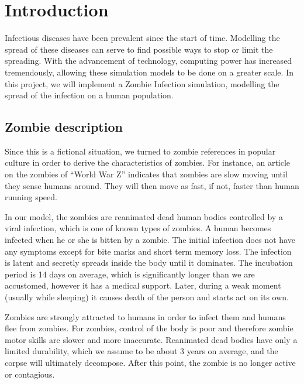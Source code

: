 \documentclass[a4paper]{article}
\title{\mytitle}
\author{Adam Juraszek \and Ryan Leong Wei Shiong \and Matthew Signorini \and Ziying Yang}
\begin{document}
\maketitle
\tableofcontents
\newpage

\section{Introduction}

Infectious diseases have been prevalent since the start of time.
Modelling the spread of these diseases can serve to find possible ways to stop or limit the spreading.
With the advancement of technology, computing power has increased tremendously, allowing these simulation models to be done on a greater scale.
In this project, we will implement a Zombie Infection simulation, modelling the spread of the infection on a human population.

\subsection{Zombie description}

Since this is a fictional situation, we turned to zombie references in popular culture in order to derive the characteristics of zombies.
For instance, an article on the zombies of ``World War Z'' indicates that zombies are slow moving until they sense humans around.
They will then move as fast, if not, faster than human running speed. \cite{guidetozombies}

In our model, the zombies are reanimated dead human bodies controlled by a viral infection, which is one of known types of zombies. \cite{survivingthedead}
A human becomes infected when he or she is bitten by a zombie.
The initial infection does not have any symptoms except for bite marks and short term memory loss.
The infection is latent and secretly spreads inside the body until it dominates.
The incubation period is 14 days on average, which is significantly longer than we are accustomed, however it has a medical support. \cite{mogk2011everything}
Later, during a weak moment (usually while sleeping) it causes death of the person and starts act on its own.

Zombies are strongly attracted to humans in order to infect them and humans flee from zombies.
For zombies, control of the body is poor and therefore zombie motor skills are slower and more inaccurate.
Reanimated dead bodies have only a limited durability, which we assume to be about 3 years on average\cite{zombiepedia}, and the corpse will ultimately decompose.
After this point, the zombie is no longer active or contagious.
\end{document}
